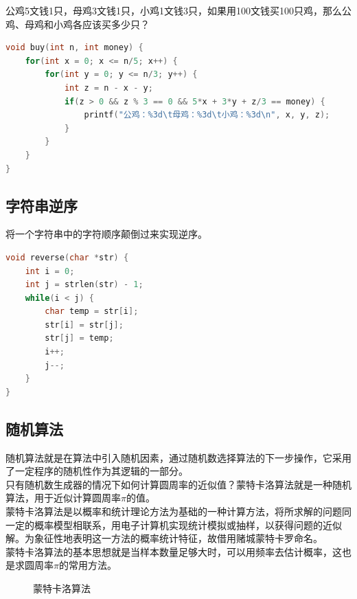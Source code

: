 公鸡5文钱1只，母鸡3文钱1只，小鸡1文钱3只，如果用100文钱买100只鸡，那么公鸡、母鸡和小鸡各应该买多少只？

\begin{lstlisting}[language=C]
void buy(int n, int money) {
	for(int x = 0; x <= n/5; x++) {
		for(int y = 0; y <= n/3; y++) {
			int z = n - x - y;
			if(z > 0 && z % 3 == 0 && 5*x + 3*y + z/3 == money) {
				printf("公鸡：%3d\t母鸡：%3d\t小鸡：%3d\n", x, y, z);
			}
		}
	}
}
\end{lstlisting}

\subsection{字符串逆序}

将一个字符串中的字符顺序颠倒过来实现逆序。 \\


\begin{lstlisting}[language=C]
void reverse(char *str) {
	int i = 0;
	int j = strlen(str) - 1;
	while(i < j) {
		char temp = str[i];
		str[i] = str[j];
		str[j] = temp;
		i++;
		j--;
	}
}
\end{lstlisting}

\subsection{随机算法}

随机算法就是在算法中引入随机因素，通过随机数选择算法的下一步操作，它采用了一定程序的随机性作为其逻辑的一部分。 \\

只有随机数生成器的情况下如何计算圆周率的近似值？蒙特卡洛算法就是一种随机算法，用于近似计算圆周率$ \pi $的值。 \\

蒙特卡洛算法是以概率和统计理论方法为基础的一种计算方法，将所求解的问题同一定的概率模型相联系，用电子计算机实现统计模拟或抽样，以获得问题的近似解。为象征性地表明这一方法的概率统计特征，故借用赌城蒙特卡罗命名。 \\

蒙特卡洛算法的基本思想就是当样本数量足够大时，可以用频率去估计概率，这也是求圆周率$ \pi $的常用方法。

\begin{figure}[H]
	\centering
	\caption{蒙特卡洛算法}
\end{figure}


